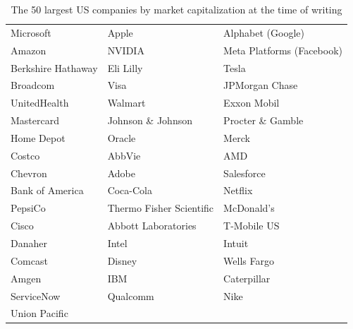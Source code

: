 \begin{table}[H]
    \centering
    \begin{tabular}{|l l l|}
        \hline
        Microsoft & Apple & Alphabet (Google) \\
        Amazon & NVIDIA & Meta Platforms (Facebook) \\
        Berkshire Hathaway & Eli Lilly & Tesla \\
        Broadcom & Visa & JPMorgan Chase \\
        UnitedHealth & Walmart & Exxon Mobil \\
        Mastercard & Johnson \& Johnson & Procter \& Gamble \\
        Home Depot & Oracle & Merck \\
        Costco & AbbVie & AMD \\
        Chevron & Adobe & Salesforce \\
        Bank of America & Coca-Cola & Netflix \\
        PepsiCo & Thermo Fisher Scientific & McDonald's \\
        Cisco & Abbott Laboratories & T-Mobile US \\
        Danaher & Intel & Intuit \\
        Comcast & Disney & Wells Fargo \\
        Amgen & IBM & Caterpillar \\
        ServiceNow & Qualcomm & Nike \\
        Union Pacific & & \\
        \hline
    \end{tabular}
    \caption{The 50 largest US companies by market capitalization at the time of writing}
    \label{table:companies}
\end{table}




